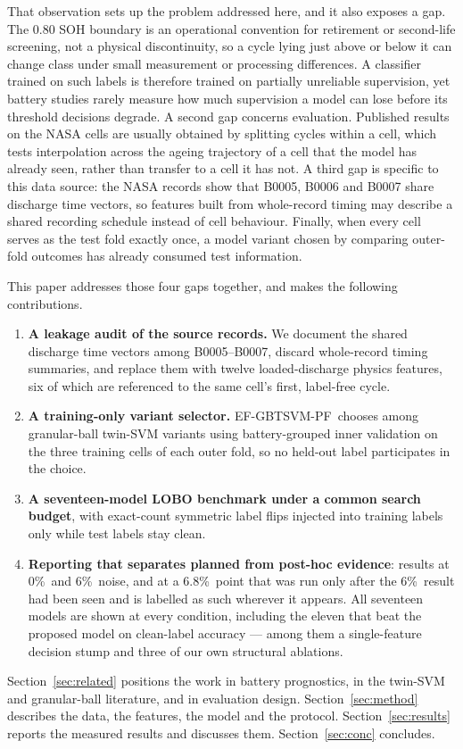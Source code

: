 \documentclass[final,5p,times,twocolumn]{elsarticle}
\newcommand{\proposed}{EF-GBTSVM-PF}
\newcommand{\nz}{\%}
\begin{document}
That observation sets up the problem addressed here, and it also exposes a gap. The 0.80 SOH boundary is an operational convention for retirement or second-life screening, not a physical discontinuity, so a cycle lying just above or below it can change class under small measurement or processing differences. A classifier trained on such labels is therefore trained on partially unreliable supervision, yet battery studies rarely measure how much supervision a model can lose before its threshold decisions degrade. A second gap concerns evaluation. Published results on the NASA cells are usually obtained by splitting cycles within a cell, which tests interpolation across the ageing trajectory of a cell that the model has already seen, rather than transfer to a cell it has not. A third gap is specific to this data source: the NASA records show that B0005, B0006 and B0007 share discharge time vectors, so features built from whole-record timing may describe a shared recording schedule instead of cell behaviour. Finally, when every cell serves as the test fold exactly once, a model variant chosen by comparing outer-fold outcomes has already consumed test information.

This paper addresses those four gaps together, and makes the following contributions.
\begin{enumerate}[label=(\roman*),itemsep=1pt]
\item \textbf{A leakage audit of the source records.} We document the shared discharge time vectors among B0005--B0007, discard whole-record timing summaries, and replace them with twelve loaded-discharge physics features, six of which are referenced to the same cell's first, label-free cycle.
\item \textbf{A training-only variant selector.} \proposed\ chooses among granular-ball twin-SVM variants using battery-grouped inner validation on the three training cells of each outer fold, so no held-out label participates in the choice.
\item \textbf{A seventeen-model LOBO benchmark under a common search budget}, with exact-count symmetric label flips injected into training labels only while test labels stay clean.
\item \textbf{Reporting that separates planned from post-hoc evidence}: results at 0\nz\ and 6\nz\ noise, and at a 6.8\nz\ point that was run only after the 6\nz\ result had been seen and is labelled as such wherever it appears. All seventeen models are shown at every condition, including the eleven that beat the proposed model on clean-label accuracy --- among them a single-feature decision stump and three of our own structural ablations.
\end{enumerate}
Section~\ref{sec:related} positions the work in battery prognostics, in the twin-SVM and granular-ball literature, and in evaluation design. Section~\ref{sec:method} describes the data, the features, the model and the protocol. Section~\ref{sec:results} reports the measured results and discusses them. Section~\ref{sec:conc} concludes.
\end{document}
